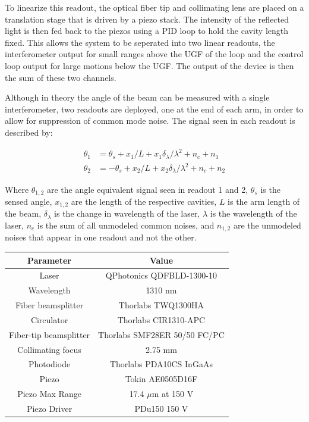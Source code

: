 \documentclass [12pt, proquest]{uwthesis}[2019]
\begin{document}
To linearize this readout, the optical fiber tip and collimating lens are placed on a translation stage that is driven by a piezo stack. The intensity of the reflected light is then fed back to the piezos using a PID loop to hold the cavity length fixed. This allows the system to be seperated into two linear readouts, the interferometer output for small ranges above the UGF of the loop and the control loop output for large motions below the UGF. The output of the device is then the sum of these two channels.


Although in theory the angle of the beam can be measured with a single interferometer, two readouts are deployed, one at the end of each arm, in order to allow for suppression of common mode noise. The signal seen in each readout is described by:

\begin{align}
\theta_1&=\theta_s+x_1/L+x_1 \delta_\lambda/\lambda^2+n_c+n_1 \label{th1} \\
\theta_2&=-\theta_s+x_2/L+x_2 \delta_\lambda/\lambda^2 + n_c+n_2 \label{th2}
\end{align}

Where $\theta_{1,2}$ are the angle equivalent signal seen in readout 1 and 2, $\theta_{s}$ is the sensed angle, $x_{1,2}$ are the length of the respective cavities, $L$ is the arm length of the beam, $\delta_\lambda$ is the change in wavelength of the laser, $\lambda$ is the wavelength of the laser, $n_c$ is the sum of all unmodeled common noises, and $n_{1,2}$ are the unmodeled noises that appear in one readout and not the other.

\begin{center}
\begin{tabular}{| c | c |}
\hline
Parameter & Value\\
\hline \hline
Laser & QPhotonics QDFBLD-1300-10\\
Wavelength & 1310 nm\\
Fiber beamsplitter & Thorlabs TWQ1300HA\\
Circulator & Thorlabs CIR1310-APC\\
Fiber-tip beamsplitter & Thorlabs SMF28ER 50/50 FC/PC\\
Collimating focus & 2.75 mm\\
Photodiode & Thorlabs PDA10CS InGaAs\\
Piezo & Tokin AE0505D16F\\
Piezo Max Range & 17.4 $\mu$m at 150 V\\
Piezo Driver & PDu150 150 V\\
\hline
\end{tabular}
\label{cBRSTable}
\end{center}
\end{document}

